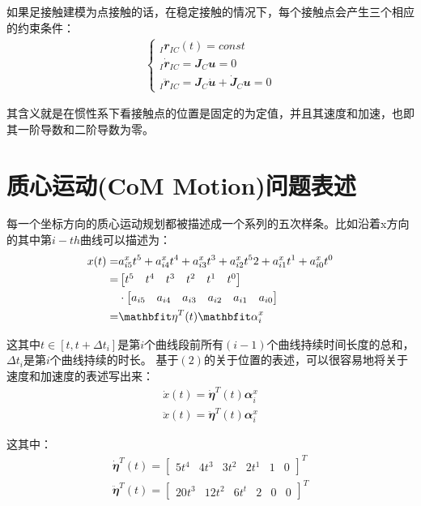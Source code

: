 如果足接触建模为点接触的话，在稳定接触的情况下，每个接触点会产生三个相应的约束条件：
\begin{align}
    \begin{cases}
        _I\mathbfit{r}_{IC}(t)=const\\
        _I \mathbfit{\dot r}_{IC}=\mathbfit{J}_C\mathbfit{u}=0\\
        _I\mathbfit{\ddot r}_{IC}=\mathbfit{J}_C \mathbfit{\dot u}+\mathbfit{\dot J}_C\mathbfit{u}=0
    \end{cases}
\end{align}

其含义就是在惯性系下看接触点的位置是固定的为定值，并且其速度和加速，也即其一阶导数和二阶导数为零。


\section{质心运动(CoM Motion)问题表述}
每一个坐标方向的质心运动规划都被描述成一个系列的五次样条。比如沿着x方向的其中第$i-th$曲线可以描述为\cite[p7]{Bellicoso_Jenelten_Gehring_Hutter_2018}：
\begin{align}
    x(t) = & a_{i5}^x t^5 +  a_{i4}^x t^4 + a_{i3}^x t^3 +  a_{i2}^x t^52+  a_{i1}^x t^1 +  a_{i0}^x t^0 \notag\\
    = & \begin{bmatrix}t^5 & t^4 & t^3 & t^2 & t^1 & t^0\end{bmatrix} \notag\\ 
    & \cdot \begin{bmatrix}a_{i5} & a_{i4} & a_{i3} & a_{i2} & a_{i1} & a_{i0}\end{bmatrix} \notag\\
    = & {\mathbfit \eta}^T(t){\mathbfit \alpha}_i^x
\end{align}

 
这其中$t\in [t, t+\Delta t_i]$是第$i$个曲线段前所有$(i-1)$个曲线持续时间长度的总和，$\Delta t_i$是第$i$个曲线持续的时长。
基于$(2)$的关于位置的表述，可以很容易地将关于速度和加速度的表述写出来：
\begin{align}
\dot x(t) = \dot {\mathbfit \eta}^T(t){\mathbfit \alpha}_i^x \\
\ddot x(t) = \ddot {\mathbfit \eta}^T(t) {\mathbfit \alpha}_i^x 
\end{align}

这其中：
\begin{align}
\dot {\mathbfit \eta}^T(t) =  \begin{bmatrix}5t^4 & 4t^3 & 3t^2 & 2t^1 & 1 & 0\end{bmatrix}^T\\
\ddot {\mathbfit \eta}^T(t) =  \begin{bmatrix}20t^3 & 12t^2 & 6t^t & 2 & 0 & 0\end{bmatrix}^T
\end{align}

